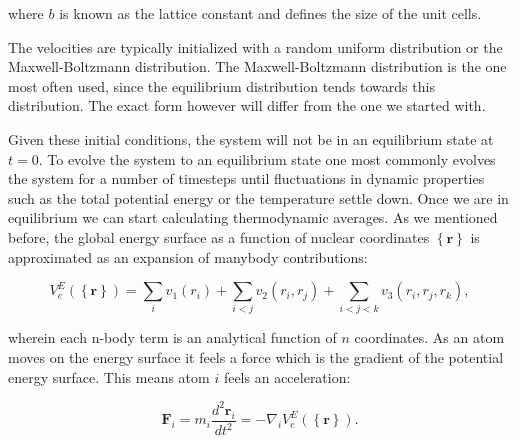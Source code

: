 where $b$ is known as the lattice constant and defines
the size of the unit cells.
\par
The velocities are typically initialized with a random uniform
distribution or the Maxwell-Boltzmann distribution.
The Maxwell-Boltzmann distribution is the one most often used,
since the equilibrium distribution tends towards this distribution.
The exact form however will differ from the one we started with.
\par
Given these initial conditions, the system will not be in an
equilibrium state at $t=0$. To evolve the system
to an equilibrium state one most commonly evolves the system
for a number of timesteps until fluctuations in dynamic
properties such as the total potential energy or the temperature
settle down. Once we are in equilibrium we can start calculating
thermodynamic averages.
\newline
\newline
As we mentioned before, the global energy surface
as a function of nuclear coordinates $\left\{ \bm{r} \right\}$
is approximated as an expansion of manybody contributions:

$$ V_e^E \left(\left\{ \bm{r} \right\}\right) =
    \sum_i v_1(r_i) + \sum_{i < j} v_2(r_i, r_j)
    + \sum_{i < j < k} v_3(r_i, r_j, r_k) , $$

wherein each n-body term is an analytical function
of $n$ coordinates.
As an atom moves on the energy surface
it feels a force which is the gradient of the potential energy surface.
This means atom $i$ feels an acceleration:

$$ \bm{F}_i = m_i \frac{d^2 \bm{r}_i}{dt^2} =
    -\nabla_i V_e^E \left( \left\{ \bm{r} \right\}\right) . $$

